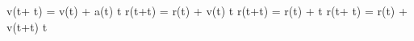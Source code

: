 v(t+ \Delta t) = v(t) + a(t) \cdot \Delta t
r(t+\Delta t) = r(t) + v(t) \Delta t
r(t+\Delta t) = r(t) +  \Delta t
r(t+ \Delta t) = r(t) + v(t+\Delta t) \Delta t